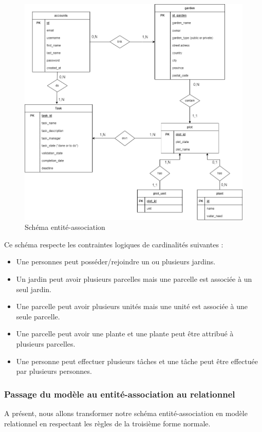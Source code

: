 \documentclass[french,a4paper]{article}
\begin{document}
\begin{figure}[H]
    \centering
    \includegraphics[width=1\textwidth]{img/Schema_entite_association_PPIIversion2.drawio.png}
    \caption{Schéma entité-association}
\end{figure}

Ce schéma respecte les contraintes logiques de cardinalités suivantes :

\begin{itemize}
    \item Une personnes peut posséder/rejoindre un ou plusieurs jardins.
    \item Un jardin peut avoir plusieurs parcelles mais une parcelle est associée à un seul jardin.
    \item Une parcelle peut avoir plusieurs unités mais une unité est associée à une seule parcelle.
    \item Une parcelle peut avoir une plante et une plante peut être attribué à plusieurs parcelles.
    \item Une personne peut effectuer plusieurs tâches et une tâche peut être effectuée par plusieurs personnes.
\end{itemize}

\subsubsection{Passage du modèle au entité-association au relationnel}
A présent, nous allons transformer notre schéma entité-association en modèle relationnel en respectant les règles de la troisième forme
normale.
\end{document}
